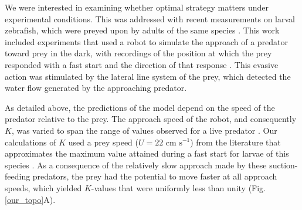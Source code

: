 \documentclass[12pt]{article}
\begin{document}
We were interested in examining whether optimal strategy matters under experimental conditions. This was addressed with recent  measurements on larval zebrafish, which were preyed upon by adults of the same species \citep{Stewart:2013bh}. 
This work included experiments that used a robot to simulate the approach of a predator toward prey in the dark, with recordings of the position at which the prey responded with a fast start and the direction of that response \citep{Stewart:2014cm}. 
This evasive action was stimulated by the lateral line system of the prey, which detected the water flow generated by the approaching predator. 

As detailed above, the predictions of the model depend on the speed of the predator relative to the prey. The approach speed of the robot, and consequently $K$, was varied to span the range of values observed for a live predator \citep{Stewart:2013bh}. 
Our calculations of $K$ used a prey speed ($U=22 \text{ cm s}^{-1}$) from the literature that approximates the maximum value attained during a fast start for larvae of this species \citep{Budick:2000wrb, Muller:2004hp}. 
As a consequence of the relatively slow approach made by these suction-feeding predators, the prey had the potential to move faster at all approach speeds, which yielded $K$-values that were uniformly less than unity (Fig. \ref{our_topo}A).
\end{document}

